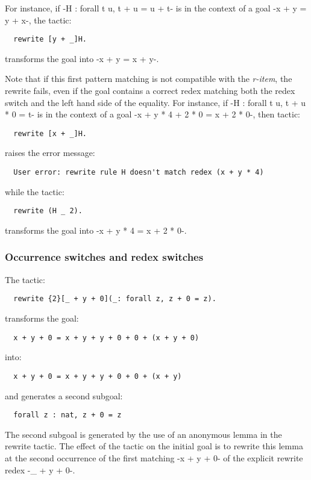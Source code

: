 For instance, if \ssrL-H : forall t u, t + u = u + t- is in the context of a
goal \ssrL-x + y = y + x-, the tactic:
\begin{lstlisting}
  rewrite [y + _]H.
\end{lstlisting}
transforms the goal into \ssrL-x + y = x + y-.

Note that if this first pattern matching is not compatible with the
\emph{r-item}, the rewrite fails, even if the goal contains a correct
redex matching both the redex switch and the left hand side of the
equality. For instance, if \ssrL-H : forall t u, t + u * 0 = t- is
in the context of a goal \ssrL-x + y * 4 + 2 * 0 = x + 2 * 0-, then tactic:
\begin{lstlisting}
  rewrite [x + _]H.
\end{lstlisting}
raises the error message:
\begin{verbatim}
  User error: rewrite rule H doesn't match redex (x + y * 4)
\end{verbatim}
while the tactic:
\begin{lstlisting}
  rewrite (H _ 2).
\end{lstlisting}
transforms the goal into \ssrL-x + y * 4 = x + 2 * 0-.


\subsubsection*{Occurrence switches and redex switches}
The tactic:
\begin{lstlisting}
  rewrite {2}[_ + y + 0](_: forall z, z + 0 = z).
\end{lstlisting}
transforms the goal:
\begin{lstlisting}
  x + y + 0 = x + y + y + 0 + 0 + (x + y + 0)
\end{lstlisting}
into:
\begin{lstlisting}
  x + y + 0 = x + y + y + 0 + 0 + (x + y)
\end{lstlisting}
and generates a second subgoal:
\begin{lstlisting}
  forall z : nat, z + 0 = z
\end{lstlisting}
The second subgoal is generated by the use of an anonymous lemma in
the rewrite tactic. The effect of the tactic on the initial goal is to
rewrite this lemma at the second occurrence of the first matching
\ssrL-x + y + 0- of the explicit rewrite redex \ssrL-_ + y + 0-.


